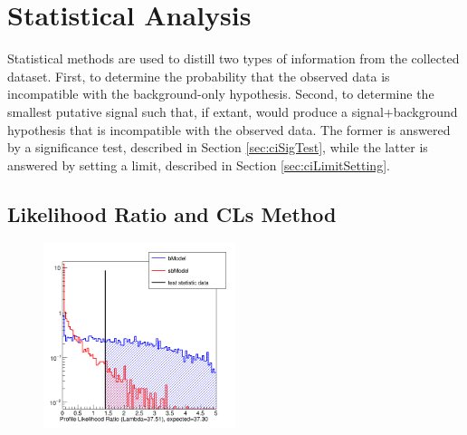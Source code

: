 \section{Statistical Analysis}\label{sec:ciStat}

Statistical methods are used to distill two types of information from the collected dataset.
First, to determine the probability that the observed data is incompatible with the background-only hypothesis.
Second, to determine the smallest putative signal such that, if extant, would produce a signal+background hypothesis that is incompatible with the observed data.
The former is answered by a significance test, described in Section \ref{sec:ciSigTest}, while the latter is answered by setting a limit, described in Section \ref{sec:ciLimitSetting}.

\subsection{Likelihood Ratio and CLs Method}


\begin{figure}[h!]
\captionsetup[subfigure]{position=b}
\centering
\includegraphics[width=0.5\textwidth]{figures/ci/profileLikelihoodPlots/toys-n29-fc-lambda-ll-const-LL-nToy5000-nSteps50-seed8.png}
\caption{}
\label{fig:ciClsProfileLikelihood}
\end{figure}

